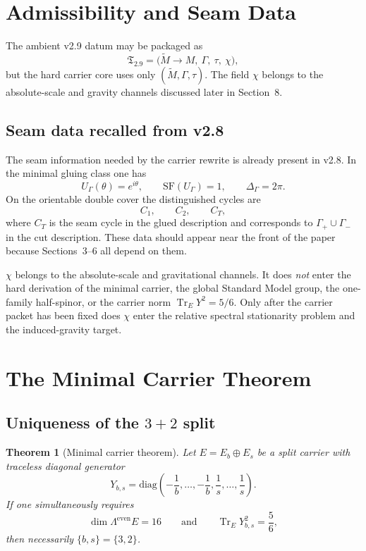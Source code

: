 \documentclass[11pt,a4paper]{article}
\newtheorem{theorem}{Theorem}[section]
\theoremstyle{definition}
\theoremstyle{remark}
\newcommand{\tr}{\operatorname{Tr}}
\begin{document}
\section{Admissibility and Seam Data}

The ambient v2.9 datum may be packaged as
\[
\mathfrak T_{2.9} = \bigl(\widetilde M \to M,\ \Gamma,\ \tau,\ \chi\bigr),
\]
but the hard carrier core uses only $(\widetilde M,\Gamma,\tau)$. The field $\chi$ belongs to the absolute-scale and gravity channels discussed later in Section~8.

\subsection{Seam data recalled from v2.8}

The seam information needed by the carrier rewrite is already present in v2.8. In the minimal gluing class one has
\[
U_\Gamma(\theta)=e^{i\theta},
\qquad
\mathrm{SF}(U_\Gamma)=1,
\qquad
\Delta_\Gamma=2\pi.
\]
On the orientable double cover the distinguished cycles are
\[
C_1,\qquad C_2,\qquad C_T,
\]
where $C_T$ is the seam cycle in the glued description and corresponds to $\Gamma_+\cup\Gamma_-$ in the cut description. These data should appear near the front of the paper because Sections~3--6 all depend on them.

\begin{tcolorbox}[colback=blue!3, colframe=blue!50!black,
    title={\textbf{What $\chi$ does and does not do}}, fonttitle=\bfseries\small]
$\chi$ belongs to the absolute-scale and gravitational channels. It does \emph{not} enter the hard derivation of the minimal carrier, the global Standard Model group, the one-family half-spinor, or the carrier norm $\tr_EY^2=5/6$. Only after the carrier packet has been fixed does $\chi$ enter the relative spectral stationarity problem and the induced-gravity target.
\end{tcolorbox}

\section{The Minimal Carrier Theorem}

\subsection{Uniqueness of the \texorpdfstring{$3+2$}{3+2} split}

\begin{theorem}[Minimal carrier theorem]
Let $E=E_b\oplus E_s$ be a split carrier with traceless diagonal generator
\[
Y_{b,s}=\mathrm{diag}\!\left(-\frac1b,\ldots,-\frac1b,\frac1s,\ldots,\frac1s\right).
\]
If one simultaneously requires
\[
\dim \Lambda^{\mathrm{even}}E = 16
\qquad\text{and}\qquad
\tr_E Y_{b,s}^2 = \frac56,
\]
then necessarily $\{b,s\}=\{3,2\}$.
\end{theorem}
\end{document}
